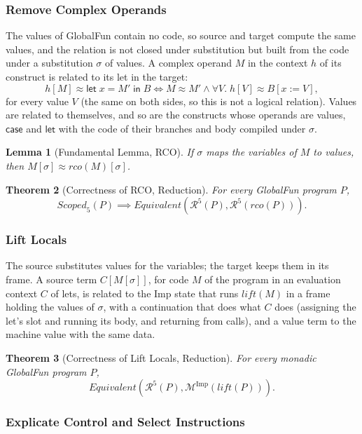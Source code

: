 \documentclass[10pt]{article}
\theoremstyle{acmplain}
\newtheorem{theorem}{Theorem}[section]
\newtheorem{lemma}[theorem]{Lemma}
\newcommand{\key}[1]{\mathsf{#1}}
\newcommand{\pass}[1]{\mathit{#1}}
\newcommand{\Let}{\key{let}\;}
\newcommand{\In}{\;\key{in}\;}
\newcommand{\Mach}[1]{\mathcal{M}^{#1}}
\newcommand{\Equiv}{\mathit{Equivalent}}
\begin{document}
\subsubsection{Remove Complex Operands}

The values of GlobalFun contain no code, so source and target compute the same
values, and the relation is not closed under substitution but built from the
code under a substitution $\sigma$ of values. A complex operand $M$ in the
context $h$ of its construct is related to its let in the target:
\[
  h[M] \approx \Let x = M' \In B \iff M \approx M' \land \forall V.\; h[V] \approx B[x := V] ,
\]
for every value $V$ (the same on both sides, so this is not a logical
relation). Values are related to themselves, and so are the constructs whose
operands are values, $\key{case}$ and $\key{let}$ with the code of their
branches and body compiled under $\sigma$.
\begin{lemma}[Fundamental Lemma, RCO]
If $\sigma$ maps the variables of $M$ to values, then $M[\sigma] \approx \pass{rco}(M)[\sigma]$.
\end{lemma}
\begin{theorem}[Correctness of RCO, Reduction]\label{thm:rco-red}
For every GlobalFun program $P$,
\[
  \mathit{Scoped}_5(P) \implies \Equiv(\mathcal{R}^{5}(P), \mathcal{R}^{5}(\pass{rco}(P))) .
\]
\end{theorem}

\subsubsection{Lift Locals}

The source substitutes values for the variables; the target keeps them in its
frame. A source term $C[M[\sigma]]$, for code $M$ of the program in an
evaluation context $C$ of lets, is related to the Imp state that runs
$\pass{lift}(M)$ in a frame holding the values of $\sigma$, with a continuation
that does what $C$ does (assigning the let's slot and running its body,
and returning from calls), and a value term to the machine value with the
same data.
\begin{theorem}[Correctness of Lift Locals, Reduction]\label{thm:lift-red}
For every monadic GlobalFun program $P$,
\[
  \Equiv(\mathcal{R}^{5}(P), \Mach{\mathrm{Imp}}(\pass{lift}(P))) .
\]
\end{theorem}

\subsubsection{Explicate Control and Select Instructions}
\end{document}
